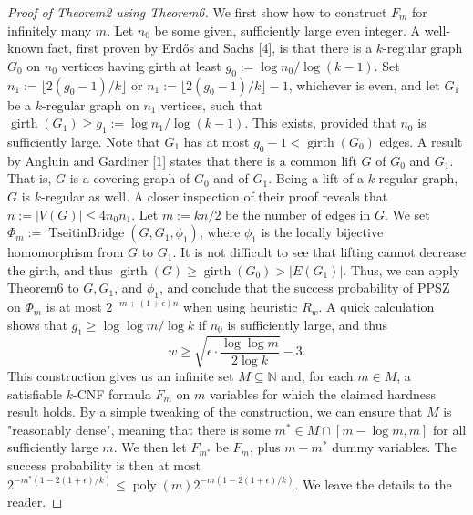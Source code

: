 \begin{proof}[Proof of Theorem2 using Theorem6]
We first show how to construct $F_m$ for infinitely many $m$. Let $n_0$ be some given, sufficiently large even integer. A well-known fact, first proven by Erd\H{o}s and Sachs [4], is that there is a $k$-regular graph $G_0$ on $n_0$ vertices having girth at least $g_0:=\log n_0/\log(k-1)$. Set $n_1:=\lfloor2(g_0-1)/k\rfloor$ or $n_1:=\lfloor2(g_0-1)/k\rfloor-1$, whichever is even, and let $G_1$ be a $k$-regular graph on $n_1$ vertices, such that $\operatorname{girth}(G_1)\ge g_1:=\log n_1/\log(k-1)$. This exists, provided that $n_0$ is sufficiently large. Note that $G_1$ has at most $g_0-1<\operatorname{girth}(G_0)$ edges.
A result by Angluin and Gardiner [1] states that there is a common lift $G$ of $G_0$ and $G_1$. That is, $G$ is a covering graph of $G_0$ and of $G_1$. Being a lift of a $k$-regular graph, $G$ is $k$-regular as well. A closer inspection of their proof reveals that $n:=|V(G)|\le4n_0n_1$.
Let $m:=kn/2$ be the number of edges in $G$. We set $\Phi_m:=\operatorname{TseitinBridge}(G,G_1,\phi_1)$, where $\phi_1$ is the locally bijective homomorphism from $G$ to $G_1$.
It is not difficult to see that lifting cannot decrease the girth, and thus $\operatorname{girth}(G)\ge\operatorname{girth}(G_0)>|E(G_1)|$. Thus, we can apply Theorem6 to $G,G_1$, and $\phi_1$, and conclude that the success probability of PPSZ on $\Phi_m$ is at most $2^{-m+(1+\epsilon)n}$ when using heuristic $R_w$. A quick calculation shows that $g_1\ge\log\log m/\log k$ if $n_0$ is sufficiently large, and thus
\[
w\ge\sqrt{\epsilon\cdot\frac{\log\log m}{2\log k}}-3.
\]
This construction gives us an infinite set $M\subseteq\mathbb N$ and, for each $m\in M$, a satisfiable $k$-CNF formula $F_m$ on $m$ variables for which the claimed hardness result holds. By a simple tweaking of the construction, we can ensure that $M$ is "reasonably dense", meaning that there is some $m^*\in M\cap[m-\log m,m]$ for all sufficiently large $m$. We then let $F_{m^*}$ be $F_m$, plus $m-m^*$ dummy variables. The success probability is then at most $2^{-m^*(1-2(1+\epsilon)/k)}\le\operatorname{poly}(m)2^{-m(1-2(1+\epsilon)/k)}$. We leave the details to the reader.
\end{proof}
